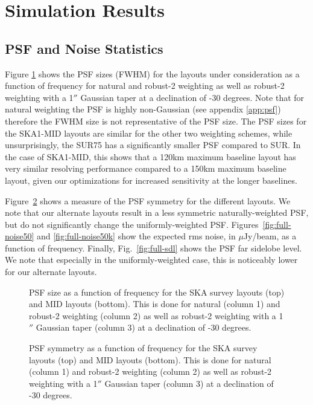 \documentclass[sfheadings,a4paper,times,9pt,floats,floatfix]{article}
\begin{document}
\section{Simulation Results}\label{sec:results}
\subsection{PSF and Noise Statistics}
Figure \ref{fig:full-psf_meam} shows the PSF sizes (FWHM) for the layouts under consideration as a function of frequency
for natural and robust-2 weighting as well as robust-2 weighting  with a 1$''$ Gaussian taper at a declination of -30
degrees. Note that for natural weighting the PSF is highly non-Gaussian (see appendix \ref{app:psf}) therefore the FWHM
size is not representative of the PSF size. The PSF sizes for the SKA1-MID layouts are similar for the other two
weighting schemes, while unsurprisingly, the SUR75 has a significantly smaller PSF compared to SUR. In the case of
SKA1-MID, this shows that a 120km maximum baseline layout has very similar resolving performance compared to a 150km
maximum baseline layout, given our optimizations for increased sensitivity at the longer baselines.

Figure~\ref{fig:full-psf_sym} shows a measure of the PSF symmetry for the different layouts. We note that our alternate 
layouts result in a less symmetric naturally-weighted PSF, but do not significantly change the uniformly-weighted PSF. 
Figures~\ref{fig:full-noise50} and \ref{fig:full-noise50k} show the expected rms noise, in $\mu$Jy/beam, as a function 
of frequency. Finally, Fig.~\ref{fig:full-sdl} shows the PSF far sidelobe level. We note that especially in the 
uniformly-weighted case, this is noticeably lower for our alternate layouts.

\begin{figure}[H]
%  
 
%  
 \caption{PSF size as a function of frequency for the SKA survey layouts (top) and MID layouts (bottom).
This is done for natural (column 1) and robust-2 weighting (column 2) as well as robust-2 weighting  with a 1$''$
Gaussian taper (column 3) at a declination of -30 degrees.}\label{fig:full-psf_meam}
\end{figure}

\begin{figure}[H]
%  
 
%  
 \caption{PSF symmetry as a function of frequency for the SKA survey layouts (top) and MID layouts (bottom).
This is done for natural (column 1) and robust-2 weighting (column 2) as well as robust-2 weighting  with a 1$''$
Gaussian taper (column 3) at a declination of -30 degrees.}\label{fig:full-psf_sym}
\end{figure}
\end{document}
